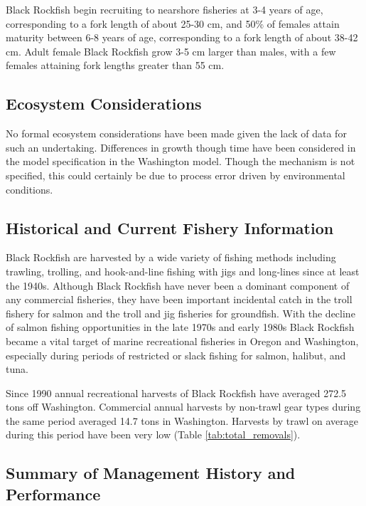 \documentclass[11pt,
  letterpaper,
]{article}
\begin{document}
Black Rockfish begin recruiting to nearshore fisheries at 3-4 years of age, corresponding to a fork length of about 25-30 cm, and 50\% of females attain maturity between 6-8 years of age, corresponding to a fork length of about 38-42 cm. Adult female Black Rockfish grow 3-5 cm larger than males, with a few females attaining fork lengths greater than 55 cm.

\hypertarget{ecosystem-considerations-1}{%
\subsection{Ecosystem Considerations}\label{ecosystem-considerations-1}}

No formal ecosystem considerations have been made given the lack of data for such an undertaking. Differences in growth though time have been considered in the model specification in the Washington model. Though the mechanism is not specified, this could certainly be due to process error driven by environmental conditions.

\hypertarget{historical-and-current-fishery-information}{%
\subsection{Historical and Current Fishery Information}\label{historical-and-current-fishery-information}}

Black Rockfish are harvested by a wide variety of fishing methods including trawling, trolling, and hook-and-line fishing with jigs and long-lines since at least the 1940s. Although Black Rockfish have never been a dominant component of any commercial fisheries, they have been important incidental catch in the troll fishery for salmon and the troll and jig fisheries for groundfish. With the decline of salmon fishing opportunities in the late 1970s and early 1980s Black Rockfish became a vital target of marine recreational fisheries in Oregon and Washington, especially during periods of restricted or slack fishing for salmon, halibut, and tuna.

Since 1990 annual recreational harvests of Black Rockfish have averaged 272.5 tons off Washington. Commercial annual harvests by non-trawl gear types during the same period averaged 14.7 tons in Washington. Harvests by trawl on average during this period have been very low (Table \ref{tab:total_removals}).

\hypertarget{summary-of-management-history-and-performance}{%
\subsection{Summary of Management History and Performance}\label{summary-of-management-history-and-performance}}
\end{document}
